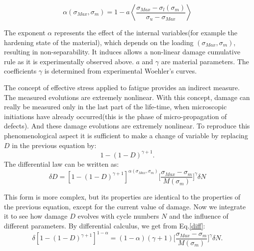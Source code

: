 \vspace{6pt}
$$\alpha(\sigma_{Max},\sigma_m)=1-a\left\langle\dfrac{\sigma_{Max}-\sigma_l(\sigma_m)}{\sigma_u-\sigma_{Max}}\right\rangle$$
\vspace{6pt}

The exponent $\alpha$ represents the effect of the internal variables(for example the hardening state of the material), which depends on the loading $(\sigma_{Max},\sigma_m)$, resulting in non-separability. It induces allows a non-linear damage cumulative rule as it is experimentally observed above. $a$ and $\gamma$ are material parameters. The coefficients $\gamma$ is determined from experimental Woehler's curves. 

The concept of effective stress applied to fatigue provides an indirect measure. The measured evolutions are extremely nonlinear. With this concept, damage can really be measured only in the last part of the life-time, when microscopic initiations have already occurred(this is the phase of micro-propagation of defects). And these damage evolutions are extremely nonlinear. To reproduce this phenomenological aspect it is sufficient to make a change of variable by replacing $D$ in the previous equation by:
$$1-(1-D)^{\gamma+1}.$$
The differential law can be written as:
\begin{equation}\delta D=[1-(1-D)^{\gamma+1}]^{\alpha(\sigma_{Max},\sigma_m)}\big[\frac{\sigma_{Max}-\sigma_m}{M(\sigma_m)}\big]^\gamma\delta N
\label{diff}
\end{equation}

This form is more complex, but its properties are identical to the properties of the previous equation, except for the current value of damage. Now we integrate it to see how damage $D$ evolves with cycle numbers $N$ and the influence of different parameters. By differential calculus, we get from Eq.\eqref{diff}:
\begin{equation}\delta [1-(1-D)^{\gamma+1}]^{1-\alpha}=(1-\alpha)(\gamma+1)\big[\frac{\sigma_{Max}-\sigma_m}{M(\sigma_m)}\big]^\gamma\delta N.
\label{easyintegration}
\end{equation}


